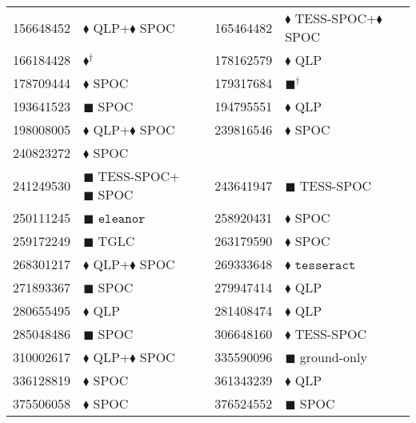 \begin{longtable}{llrllr}
156648452 & $\blacklozenge$ QLP+$\blacklozenge$ SPOC & \cite{TIC_156648452} & 165464482 & $\blacklozenge$ TESS-SPOC+$\blacklozenge$ SPOC & \cite{TIC_446549906} \\
166184428 & $\blacklozenge^\dagger$ & \cite{TIC_166184428} & 178162579 & $\blacklozenge$ QLP & \cite{TIC_156648452} \\
178709444 & $\blacklozenge$ SPOC & \cite{TIC_178709444} & 179317684 & $\blacksquare^\dagger$ & \cite{TIC_179317684} \\
193641523 & $\blacksquare$ SPOC & \cite{TIC_193641523} & 194795551 & $\blacklozenge$ QLP & \cite{TIC_70524163} \\
198008005 & $\blacklozenge$ QLP+$\blacklozenge$ SPOC & \cite{TIC_198008005} & 239816546 & $\blacklozenge$ SPOC & \cite{TIC_70524163} \\
240823272 & $\blacklozenge$ SPOC & \cite{TIC_70524163} \\
241249530 & $\blacksquare$ TESS-SPOC+$\blacksquare$ SPOC & \cite{TIC_241249530} & 243641947 & $\blacksquare$ TESS-SPOC & \cite{TIC_243641947} \\
250111245 & $\blacksquare$ $\texttt{eleanor}$ & \cite{TIC_20182780} & 258920431 & $\blacklozenge$ SPOC & \cite{TIC_70524163} \\
259172249 & $\blacksquare$ TGLC & \cite{TIC_259172249} & 263179590 & $\blacklozenge$ SPOC & \cite{TIC_263179590} \\
268301217 & $\blacklozenge$ QLP+$\blacklozenge$ SPOC & \cite{TIC_156648452} & 269333648 & $\blacklozenge$ $\texttt{tesseract}$ & \cite{TIC_4672985} \\
271893367 & $\blacksquare$ SPOC & \cite{TIC_271893367} & 279947414 & $\blacklozenge$ QLP & \cite{TIC_156648452} \\
280655495 & $\blacklozenge$ QLP & \cite{TIC_156648452} & 281408474 & $\blacklozenge$ QLP & \cite{TIC_409794137} \\
285048486 & $\blacksquare$ SPOC & \cite{TIC_285048486} & 306648160 & $\blacklozenge$ TESS-SPOC & \cite{TIC_446549906} \\
310002617 & $\blacklozenge$ QLP+$\blacklozenge$ SPOC & \cite{TIC_156648452} & 335590096 & $\blacksquare$ ground-only & \cite{TIC_335590096} \\
336128819 & $\blacklozenge$ SPOC & \cite{TIC_336128819} & 361343239 & $\blacklozenge$ QLP & \cite{TIC_156648452} \\
375506058 & $\blacklozenge$ SPOC & \cite{TIC_375506058} & 376524552 & $\blacksquare$ SPOC & \cite{TIC_428787891} \\

\end{longtable}
